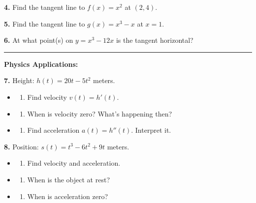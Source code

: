 \documentclass[
  11pt,
]{article}
\providecommand{\tightlist}{%
  \setlength{\itemsep}{0pt}\setlength{\parskip}{0pt}}
\begin{document}
\textbf{4.} Find the tangent line to \(f(x) = x^2\) at \((2, 4)\).

\textbf{5.} Find the tangent line to \(g(x) = x^3 - x\) at \(x = 1\).

\textbf{6.} At what point(s) on \(y = x^3 - 12x\) is the tangent
horizontal?

\begin{center}\rule{0.5\linewidth}{0.5pt}\end{center}

\textbf{Physics Applications:}

\textbf{7.} Height: \(h(t) = 20t - 5t^2\) meters.

\begin{itemize}
\item
  \begin{enumerate}
  \def\labelenumi{(\alph{enumi})}
  \tightlist
  \item
    Find velocity \(v(t) = h'(t)\).
  \end{enumerate}
\item
  \begin{enumerate}
  \def\labelenumi{(\alph{enumi})}
  \setcounter{enumi}{1}
  \tightlist
  \item
    When is velocity zero? What's happening then?
  \end{enumerate}
\item
  \begin{enumerate}
  \def\labelenumi{(\alph{enumi})}
  \setcounter{enumi}{2}
  \tightlist
  \item
    Find acceleration \(a(t) = h''(t)\). Interpret it.
  \end{enumerate}
\end{itemize}

\textbf{8.} Position: \(s(t) = t^3 - 6t^2 + 9t\) meters.

\begin{itemize}
\item
  \begin{enumerate}
  \def\labelenumi{(\alph{enumi})}
  \tightlist
  \item
    Find velocity and acceleration.
  \end{enumerate}
\item
  \begin{enumerate}
  \def\labelenumi{(\alph{enumi})}
  \setcounter{enumi}{1}
  \tightlist
  \item
    When is the object at rest?
  \end{enumerate}
\item
  \begin{enumerate}
  \def\labelenumi{(\alph{enumi})}
  \setcounter{enumi}{2}
  \tightlist
  \item
    When is acceleration zero?
  \end{enumerate}
\end{itemize}
\end{document}
